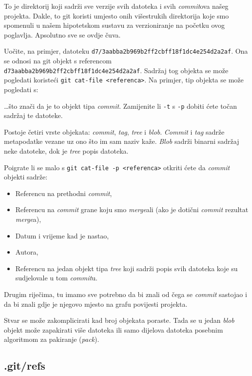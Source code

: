 To je direktorij koji sadrži sve verzije svih datoteka i svih \emph{commit}ova našeg projekta.
Dakle, to git koristi umjesto onih višestrukih direktorija koje smo spomenuli u našem hipotetskom sustavu za verzioniranje na početku ovog poglavlja.
Apsolutno sve se ovdje čuva.

Uočite, na primjer, datoteku \verb+d7/3aabba2b969b2ff2cbff18f1dc4e254d2a2af+.
Ona se odnosi na git objekt s referencom \verb+d73aabba2b969b2ff2cbff18f1dc4e254d2a2af+.
Sadržaj tog objekta se može pogledati koristeći \verb+git cat-file <referenca>+.
Na primjer, tip objekta se može pogledati s:



\dots{}što znači da je to objekt tipa \emph{commit}.
Zamijenite li \verb+-t+ s \verb+-p+ dobiti ćete točan sadržaj te datoteke.

Postoje četiri vrste objekata: \emph{commit}, \emph{tag}, \emph{tree} i \emph{blob}. 
\emph{Commit} i \emph{tag} sadrže metapodatke vezane uz ono što im sam naziv kaže.
\emph{Blob} sadrži binarni sadržaj neke datoteke, dok je \emph{tree} popis datoteka.

Poigrate li se malo s \verb+git cat-file -p <referenca>+ otkriti ćete da \emph{commit} objekti sadrže:

\begin{itemize}
	\item Referencu na prethodni \emph{commit},
	\item Referencu na \emph{commit} grane koju smo \emph{merge}ali (ako je dotični \emph{commit} rezultat \emph{merge}a),
	\item Datum i vrijeme kad je nastao,
	\item Autora,
	\item Referencu na jedan objekt tipa \emph{tree} koji sadrži popis svih datoteka koje su sudjelovale u tom \emph{commit}u.
\end{itemize}

Drugim riječima, tu imamo sve potrebno da bi znali od čega se \emph{commit} sastojao i da bi znali gdje je njegovo mjesto na grafu povijesti projekta.

Stvar se može zakomplicirati kad broj objekata poraste.
Tada se u jedan \emph{blob} objekt može zapakirati više datoteka ili samo dijelova datoteka posebnim algoritmom za pakiranje (\emph{pack}).

\subsection*{.git/refs}

